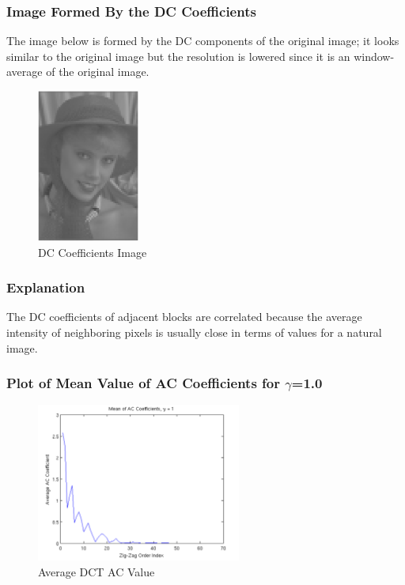 \documentclass{article}
\begin{document}
		\subsubsection{Image Formed By the DC Coefficients}
			The image below is formed by the DC components of the original image; it
			looks similar to the original image but the resolution is lowered since
			it is an window-average of the original image. \\
			\begin{figure}[!htb]
				\begin{center}
					\includegraphics[width=0.3\textwidth]{img03y_dcc.png}
					\caption{DC Coefficients Image}
				\end{center}
			\end{figure}
		\subsubsection{Explanation}
			The DC coefficients of adjacent blocks are correlated because the average
			intensity of neighboring pixels is usually close in terms of values for a
			natural image.
		\subsubsection{Plot of Mean Value of AC Coefficients for $\gamma$=1.0}
			\begin{figure}[!htb]
				\begin{center}
					\includegraphics[width=0.6\textwidth]{mean_zigzag.png}
					\caption{Average DCT AC Value}
				\end{center}
			\end{figure}
\end{document}
